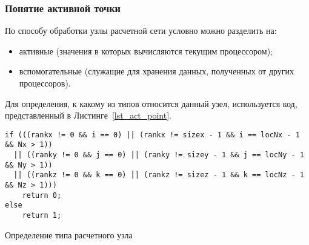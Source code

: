 \subsubsection*{Понятие активной точки}
По способу обработки узлы расчетной сети условно можно
разделить на:
\begin{itemize}
 \item активные (значения в которых вычисляются текущим процессором);
 \item вспомогательные (служащие для хранения данных, полученных от
 других процессоров).
\end{itemize}
Для определения, к какому из типов относится данный узел,
используется код, представленный в Листинге~\ref{lst_act_point}.
\begin{listing}
\begin{verbatim}
if (((rankx != 0 && i == 0) || (rankx != sizex - 1 && i == locNx - 1 && Nx > 1))
  || ((ranky != 0 && j == 0) || (ranky != sizey - 1 && j == locNy - 1 && Ny > 1))
  || ((rankz != 0 && k == 0) || (rankz != sizez - 1 && k == locNz - 1 && Nz > 1)))
    return 0;
else
    return 1;
\end{verbatim}
\caption{Определение типа расчетного узла}
\label{lst_act_point}
\end{listing}

